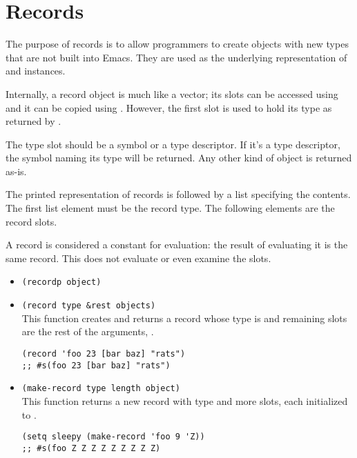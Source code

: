 
\chapter{Records}
\label{cha:records}

The purpose of records is to allow programmers to create objects with new types that are not built into Emacs.
They are used as the underlying representation of  and  instances.


Internally, a record object is much like a vector; its slots can be accessed using  and it can be copied using .
However, the first slot is used to hold its type as returned by .


The type slot should be a symbol or a type descriptor.
If it’s a type descriptor, the symbol naming its type will be returned.
Any other kind of object is returned as-is.

The printed representation of records is  followed by a list specifying the contents.
The first list element must be the record type.
The following elements are the record slots.

A record is considered a constant for evaluation: the result of evaluating it is the same record.
This does not evaluate or even examine the slots.


\begin{itemize}
\item \lstinline|(recordp object)|
\item \lstinline|(record type &rest objects)|\\
  This function creates and returns a record whose type is  and remaining slots are the rest of the arguments, .
\begin{lstlisting}
(record 'foo 23 [bar baz] "rats")
;; #s(foo 23 [bar baz] "rats")
\end{lstlisting}
\item \lstinline|(make-record type length object)|\\
  This function returns a new record with type  and  more slots, each initialized to .
\begin{lstlisting}
(setq sleepy (make-record 'foo 9 'Z))
;; #s(foo Z Z Z Z Z Z Z Z Z)
\end{lstlisting}
\end{itemize}

